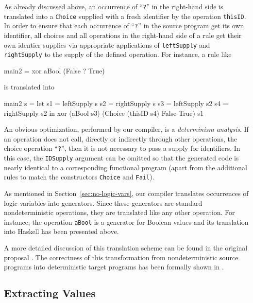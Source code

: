 \documentclass{llncs}
\newcommand{\code}[1]{\mbox{\small\texttt{#1}}}
\newcommand{\ccode}[1]{``\code{#1}''}
\begin{document}
As already discussed above, an occurrence of \ccode{?}
in the right-hand side is translated into a \code{Choice} supplied
with a fresh identifier by the operation \code{thisID}.
In order to ensure that each occurrence of \ccode{?} in the source program
get its own identifier, all choices and all operations in the right-hand
side of a rule get their own identier supplies via appropriate
applications of \code{leftSupply} and \code{rightSupply}
to the supply of the defined operation.
For instance, a rule like
\begin{curry}
  main2 = xor aBool (False ? True)
\end{curry}
is translated into
\begin{haskell}
  main2 s = let s1 = leftSupply  s
                s2 = rightSupply s
                s3 = leftSupply  s2
                s4 = rightSupply s2
             in xor (aBool s3) (Choice (thisID s4) False True) s1
\end{haskell}
An obvious optimization, performed by our compiler,
is a \emph{determinism analysis}.
If an operation does not call, directly or indirectly through
other operations, the choice operation \ccode{?},
then it is not necessary to pass a supply for identifiers.
In this case, the \code{IDSupply} argument can be omitted
so that the generated code is nearly identical to a corresponding
functional program (apart from the additional rules to match
the constructors \code{Choice} and \code{Fail}).

As mentioned in Section~\ref{sec:no-logic-vars},
our compiler translates occurrences of logic variables
into generators. Since these generators are standard
nondeterministic operations, they are translated like any other operation.
For instance, the operation \code{aBool} is a generator for
Boolean values and its translation into Haskell has been presented above.

A more detailed discussion of this translation scheme can be found
in the original proposal \cite{BrasselFischer08IFL}.
The correctness of this transformation from nondeterministic source programs
into deterministic target programs has been formally shown
in \cite{Brassel11Thesis}.


\subsection{Extracting Values}
\end{document}
